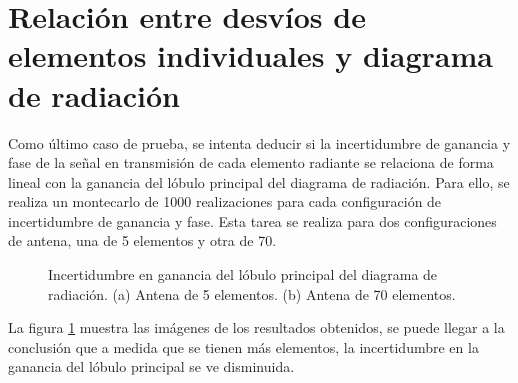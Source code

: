 \section{Relación entre desvíos de elementos individuales y diagrama de radiación}
\label{sc:relationDispersionRadiationPattern}

Como último caso de prueba, se intenta deducir si la incertidumbre de ganancia y fase de la señal en transmisión de cada elemento
radiante se relaciona de forma lineal con la ganancia del lóbulo principal del diagrama de radiación. Para ello, se realiza
un montecarlo de 1000 realizaciones para cada configuración de incertidumbre de ganancia y fase. Esta tarea se realiza para dos
configuraciones de antena, una de 5 elementos y otra de 70.
\begin{figure}[H]
	\centering
	\caption{Incertidumbre en ganancia del lóbulo principal del diagrama de radiación. (a) Antena de 5 elementos. (b) Antena de 
	70 elementos.}
	\label{fig:antennaMontecarlo}
\end{figure}

La figura \ref{fig:antennaMontecarlo} muestra las imágenes de los resultados obtenidos, se puede llegar a la conclusión que a
medida que se tienen más elementos, la incertidumbre en la ganancia del lóbulo principal se ve disminuida.


